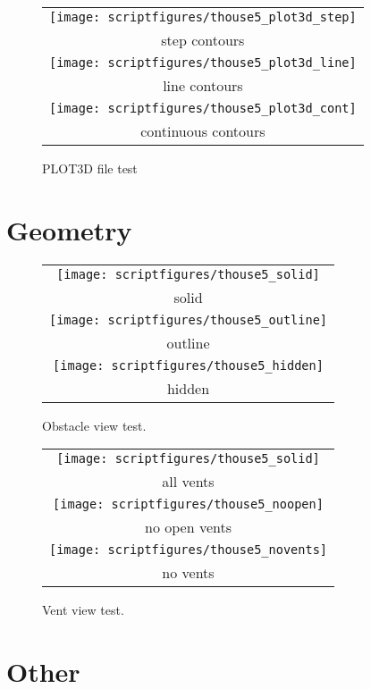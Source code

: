 \begin{figure}[\figoptions]
\begin{center}
\begin{tabular}{c}
 \texttt{[image: scriptfigures/thouse5\_plot3d\_step]}\\
 step contours\\
 \texttt{[image: scriptfigures/thouse5\_plot3d\_line]}\\
 line contours\\
 \texttt{[image: scriptfigures/thouse5\_plot3d\_cont]}\\
 continuous contours
 \end{tabular}
\end{center}
 \caption{PLOT3D file test}
\label{figPLOT3Dtest}%
\end{figure}
\section{Geometry}
\begin{figure}[\figoptions]
\begin{center}
\begin{tabular}{c}
 \texttt{[image: scriptfigures/thouse5\_solid]}\\
 solid\\
 \texttt{[image: scriptfigures/thouse5\_outline]}\\
 outline\\
 \texttt{[image: scriptfigures/thouse5\_hidden]}\\
 hidden\\

 \end{tabular}
\end{center}
 \caption{Obstacle view test.}
\label{figobstest}%
\end{figure}

\begin{figure}[\figoptions]
\begin{center}
\begin{tabular}{c}
 \texttt{[image: scriptfigures/thouse5\_solid]}\\
 all vents\\
 \texttt{[image: scriptfigures/thouse5\_noopen]}\\
 no open vents\\
 \texttt{[image: scriptfigures/thouse5\_novents]}\\
 no vents\\

 \end{tabular}
\end{center}
 \caption{Vent view test.}
\label{figventest}%
\end{figure}


\section{Other}

